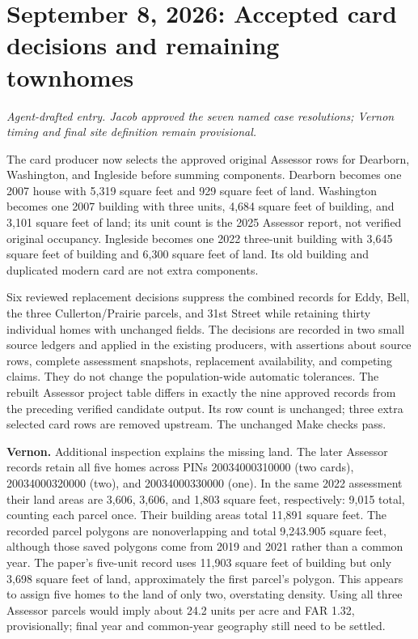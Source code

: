 \section*{September 8, 2026: Accepted card decisions and remaining townhomes}
\textit{Agent-drafted entry. Jacob approved the seven named case resolutions; Vernon timing and final site definition remain provisional.}

The card producer now selects the approved original Assessor rows for Dearborn,
Washington, and Ingleside before summing components. Dearborn becomes one 2007
house with 5,319 square feet and 929 square feet of land. Washington becomes one
2007 building with three units, 4,684 square feet of building, and 3,101 square feet
of land; its unit count is the 2025 Assessor report, not verified original occupancy.
Ingleside becomes one 2022 three-unit building with 3,645 square feet of building
and 6,300 square feet of land. Its old building and duplicated modern card are
not extra components.

Six reviewed replacement decisions suppress the combined records for Eddy, Bell,
the three Cullerton/Prairie parcels, and 31st Street while retaining thirty
individual homes with unchanged fields. The decisions are recorded in two small
source ledgers and applied in the existing producers, with assertions about
source rows, complete assessment snapshots, replacement availability, and
competing claims. They do not change the population-wide automatic tolerances.
The rebuilt Assessor project table differs in exactly the nine approved records
from the preceding verified candidate output. Its row count is unchanged; three
extra selected card rows are removed upstream. The unchanged Make checks pass.

\textbf{Vernon.} Additional inspection explains the missing land. The later
Assessor records retain all five homes across PINs 20034000310000 (two cards),
20034000320000 (two), and 20034000330000 (one). In the same 2022 assessment their
land areas are 3,606, 3,606, and 1,803 square feet, respectively: 9,015 total,
counting each parcel once. Their building areas total 11,891 square feet. The
recorded parcel polygons are nonoverlapping and total 9,243.905 square feet,
although those saved polygons come from 2019 and 2021 rather than a common year.
The paper's five-unit record uses 11,903 square feet of building but only 3,698
square feet of land, approximately the first parcel's polygon. This appears to
assign five homes to the land of only two, overstating density. Using all three
Assessor parcels would imply about 24.2 units per acre and FAR 1.32, provisionally;
final year and common-year geography still need to be settled.

